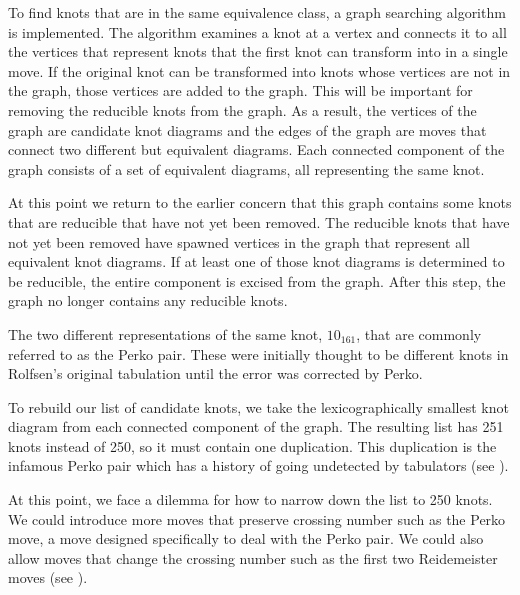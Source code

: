 \begin{paper}

To find knots that are in the same equivalence class, a graph searching
algorithm is implemented.
The algorithm examines a knot at a vertex and connects it to all the vertices
that represent knots that the first knot can transform into in a single move.
If the original knot can be transformed into knots whose vertices are not in the
graph, those vertices are added to the graph.
This will be important for removing the reducible knots from the graph.
As a result, the vertices of the graph are candidate knot diagrams and the edges
of the graph are moves that connect two different but equivalent diagrams.
Each connected component of the graph consists of a set of equivalent diagrams,
all representing the same knot.

At this point we return to the earlier concern that this graph contains some
knots that are reducible that have not yet been removed.
The reducible knots that have not yet been removed have spawned vertices in the
graph that represent all equivalent knot diagrams.
If at least one of those knot diagrams is determined to be reducible, the entire
component is excised from the graph.
After this step, the graph no longer contains any reducible knots.

{The two different representations of the same knot,
$10_{161}$, that are commonly referred to as the Perko pair.
These were initially thought to be different knots in Rolfsen's original
tabulation until the error was corrected by Perko.}

To rebuild our list of candidate knots, we take the lexicographically smallest
knot diagram from each connected component of the graph.
The resulting list has 251 knots instead of 250, so it must contain one
duplication.
This duplication is the infamous Perko pair which has a
history of going undetected by tabulators (see \figPerko).

At this point, we face a dilemma for how to narrow down the list to 250 knots.
We could introduce more moves that preserve crossing number such as the Perko
move, a move designed specifically to deal with the Perko pair.
We could also allow moves that change the crossing number such as the first two
Reidemeister moves (see \figMoves).


\end{paper}

